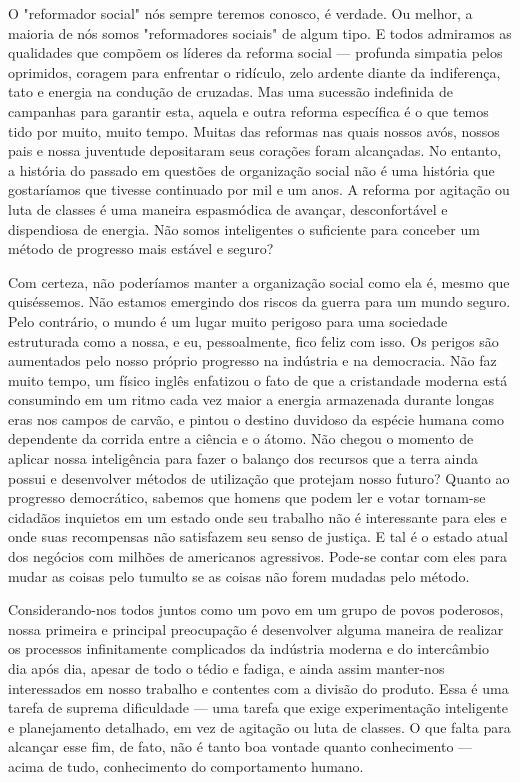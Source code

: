 \documentclass[12pt]{article}
\begin{document}
O "reformador social" nós sempre teremos conosco, é verdade. Ou melhor, a maioria de nós somos "reformadores sociais" de algum tipo. E todos admiramos as qualidades que compõem os líderes da reforma social — profunda simpatia pelos oprimidos, coragem para enfrentar o ridículo, zelo ardente diante da indiferença, tato e energia na condução de cruzadas. Mas uma sucessão indefinida de campanhas para garantir esta, aquela e outra reforma específica é o que temos tido por muito, muito tempo. Muitas das reformas nas quais nossos avós, nossos pais e nossa juventude depositaram seus corações foram alcançadas. No entanto, a história do passado em questões de organização social não é uma história que gostaríamos que tivesse continuado por mil e um anos. A reforma por agitação ou luta de classes é uma maneira espasmódica de avançar, desconfortável e dispendiosa de energia. Não somos inteligentes o suficiente para conceber um método de progresso mais estável e seguro?

Com certeza, não poderíamos manter a organização social como ela é, mesmo que quiséssemos. Não estamos emergindo dos riscos da guerra para um mundo seguro. Pelo contrário, o mundo é um lugar muito perigoso para uma sociedade estruturada como a nossa, e eu, pessoalmente, fico feliz com isso. Os perigos são aumentados pelo nosso próprio progresso na indústria e na democracia. Não faz muito tempo, um físico inglês enfatizou o fato de que a cristandade moderna está consumindo em um ritmo cada vez maior a energia armazenada durante longas eras nos campos de carvão, e pintou o destino duvidoso da espécie humana como dependente da corrida entre a ciência e o átomo. Não chegou o momento de aplicar nossa inteligência para fazer o balanço dos recursos que a terra ainda possui e desenvolver métodos de utilização que protejam nosso futuro? Quanto ao progresso democrático, sabemos que homens que podem ler e votar tornam-se cidadãos inquietos em um estado onde seu trabalho não é interessante para eles e onde suas recompensas não satisfazem seu senso de justiça. E tal é o estado atual dos negócios com milhões de americanos agressivos. Pode-se contar com eles para mudar as coisas pelo tumulto se as coisas não forem mudadas pelo método.

Considerando-nos todos juntos como um povo em um grupo de povos poderosos, nossa primeira e principal preocupação é desenvolver alguma maneira de realizar os processos infinitamente complicados da indústria moderna e do intercâmbio dia após dia, apesar de todo o tédio e fadiga, e ainda assim manter-nos interessados em nosso trabalho e contentes com a divisão do produto. Essa é uma tarefa de suprema dificuldade — uma tarefa que exige experimentação inteligente e planejamento detalhado, em vez de agitação ou luta de classes. O que falta para alcançar esse fim, de fato, não é tanto boa vontade quanto conhecimento — acima de tudo, conhecimento do comportamento humano.
\end{document}
